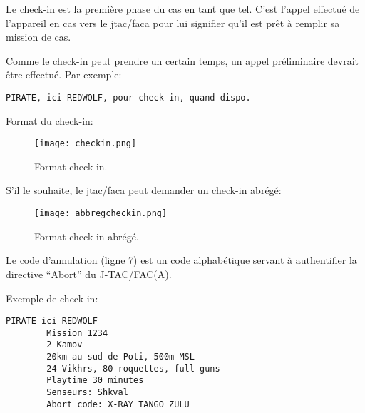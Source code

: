 \begin{e1}
	\begin{minipage}{\linewidth}
	\item
	Le check-in est la première phase du \acrshort{cas} en tant que tel. C’est l’appel effectué de l’appareil en \acrshort{cas} vers le \acrshort{jtac}/\acrshort{faca} pour lui signifier qu’il est prêt à remplir sa mission de \acrshort{cas}.
	\item Comme le check-in peut prendre un certain temps, un appel préliminaire devrait être effectué. Par exemple:
	\begin{lstlisting}[caption=Appel préliminaire, label=preliminary_call]
	PIRATE, ici REDWOLF, pour check-in, quand dispo.
	\end{lstlisting}
	\end{minipage}

	\begin{minipage}{\linewidth}
	\item Format du check-in:
	\begin{figure}[H]
		\texttt{[image: checkin.png]}
		\caption{Format check-in.}
		\label{fig:checkin}
	\end{figure}	
	\end{minipage}
	
	\begin{minipage}{\linewidth}
	\item S'il le souhaite, le \gls{jtac}/\gls{faca} peut demander un check-in abrégé:
	\begin{figure}[H]
		\texttt{[image: abbregcheckin.png]}
		\caption{Format check-in abrégé.}
		\label{fig:abbregcheckin}
	\end{figure}
	\end{minipage}
	
	\item Le code d’annulation (ligne 7) est un code alphabétique servant à authentifier la directive ``Abort'' du J-TAC/FAC(A).
	
	\begin{minipage}{\linewidth}
	\item Exemple de check-in:
	\begin{lstlisting}[caption=Check-in, label=checkin]
	PIRATE ici REDWOLF
		Mission 1234
		2 Kamov
		20km au sud de Poti, 500m MSL
		24 Vikhrs, 80 roquettes, full guns
		Playtime 30 minutes
		Senseurs: Shkval
		Abort code: X-RAY TANGO ZULU
	\end{lstlisting}
	\end{minipage}
\end{e1}
